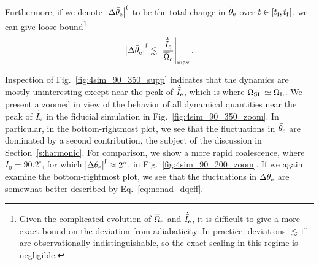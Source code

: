\documentclass[
        twocolumn,
        twocolappendix
    ]{aastex63}
\newcommand*{\abs}[1]{\left|#1\right|}
\begin{document}
Furthermore, if we denote $\abs{\Delta \bar{\theta}_{\rm e}}^{\rm f}$ to be the
total change in $\bar{\theta}_{\rm e}$ over $t \in [t_{\rm i}, t_{\rm f}]$, we
can give loose bound\footnote{Given the complicated evolution of
$\overline{\Omega}_{\rm e}$ and $\dot{\bar{I}}_{\rm e}$, it is difficult to give
a more exact bound on the deviation from adiabaticity. In practice, deviations
$\lesssim 1^\circ$ are observationally indistinguishable, so the exact scaling
in this regime is negligible.}
\begin{equation}
    \abs{\Delta \bar{\theta}_{\rm e}}^{\rm f} \lesssim
        \abs{\frac{\dot{\bar{I}}_{\rm e}}{\overline{\Omega}_{\rm e}}}_{\max}.
        \label{eq:nonad_dqeff_tot}
\end{equation}

Inspection of Fig.~\ref{fig:4sim_90_350_supp} indicates that the dynamics are
mostly uninteresting except near the peak of $\dot{\bar{I}}_{\rm e}$, which is
where $\Omega_{\rm SL} \simeq \Omega_{\rm L}$. We present a zoomed in view of
the behavior of all dynamical quantities near the peak of $\dot{\bar{I}}_{\rm
e}$ in the fiducial simulation in Fig.~\ref{fig:4sim_90_350_zoom}. In
particular, in the bottom-rightmost plot, we see that the fluctuations in
$\bar{\theta}_{\rm e}$ are dominated by a second contribution, the subject of
the discussion in Section~\ref{s:harmonic}. For comparison, we show a more rapid
coalescence, where $I_0 = 90.2^\circ$, for which $\abs{\Delta \theta_{\rm
e}}^{\rm f} \approx 2^\circ$, in Fig.~\ref{fig:4sim_90_200_zoom}. If we again
examine the bottom-rightmost plot, we see that the fluctuations in $\Delta
\bar{\theta}_{\rm e}$ are somewhat better described by Eq.~\eqref{eq:nonad_dqeff}.
\end{document}
